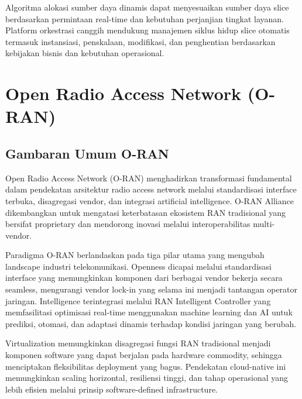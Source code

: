 Algoritma alokasi sumber daya dinamis dapat menyesuaikan sumber daya slice berdasarkan permintaan real-time dan kebutuhan perjanjian tingkat layanan. Platform orkestrasi canggih mendukung manajemen siklus hidup slice otomatis termasuk instansiasi, penskalaan, modifikasi, dan penghentian berdasarkan kebijakan bisnis dan kebutuhan operasional.

\section{Open Radio Access Network (O-RAN)}

\subsection{Gambaran Umum O-RAN}

Open Radio Access Network (O-RAN) menghadirkan transformasi fundamental dalam pendekatan arsitektur radio access network melalui standardisasi interface terbuka, disagregasi vendor, dan integrasi artificial intelligence. O-RAN Alliance dikembangkan untuk mengatasi keterbatasan ekosistem RAN tradisional yang bersifat proprietary dan mendorong inovasi melalui interoperabilitas multi-vendor.


Paradigma O-RAN berlandaskan pada tiga pilar utama yang mengubah landscape industri telekomunikasi. Openness dicapai melalui standardisasi interface yang memungkinkan komponen dari berbagai vendor bekerja secara seamless, mengurangi vendor lock-in yang selama ini menjadi tantangan operator jaringan. Intelligence terintegrasi melalui RAN Intelligent Controller yang memfasilitasi optimisasi real-time menggunakan machine learning dan AI untuk prediksi, otomasi, dan adaptasi dinamis terhadap kondisi jaringan yang berubah.

Virtualization memungkinkan disagregasi fungsi RAN tradisional menjadi komponen software yang dapat berjalan pada hardware commodity, sehingga menciptakan fleksibilitas deployment yang bagus. Pendekatan cloud-native ini memungkinkan scaling horizontal, resiliensi tinggi, dan tahap operasional yang lebih efisien melalui prinsip software-defined infrastructure.


